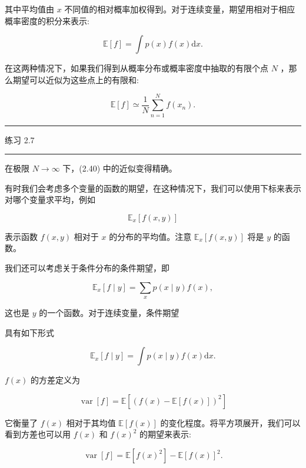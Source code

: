 \documentclass[10pt]{article}
\newcommand{\HRule}{\begin{center}\rule{0.9\linewidth}{0.2mm}\end{center}}
\begin{document}
其中平均值由 \(x\) 不同值的相对概率加权得到。对于连续变量，期望用相对于相应概率密度的积分来表示:

\[
\mathbb{E}\left\lbrack  f\right\rbrack   = \int p\left( x\right) f\left( x\right) \mathrm{d}x. \tag{2.39}
\]

在这两种情况下，如果我们得到从概率分布或概率密度中抽取的有限个点 \(N\) ，那么期望可以近似为这些点上的有限和:

\[
\mathbb{E}\left\lbrack  f\right\rbrack   \simeq  \frac{1}{N}\mathop{\sum }\limits_{{n = 1}}^{N}f\left( {x}_{n}\right) . \tag{2.40}
\]

\HRule

练习 2.7

\HRule

在极限 \(N \rightarrow  \infty\) 下，(2.40) 中的近似变得精确。

有时我们会考虑多个变量的函数的期望，在这种情况下，我们可以使用下标来表示对哪个变量求平均，例如

\[
{\mathbb{E}}_{x}\left\lbrack  {f\left( {x,y}\right) }\right\rbrack   \tag{2.41}
\]

表示函数 \(f\left( {x,y}\right)\) 相对于 \(x\) 的分布的平均值。注意 \({\mathbb{E}}_{x}\left\lbrack  {f\left( {x,y}\right) }\right\rbrack\) 将是 \(y\) 的函数。

我们还可以考虑关于条件分布的条件期望，即

\[
{\mathbb{E}}_{x}\left\lbrack  {f \mid  y}\right\rbrack   = \mathop{\sum }\limits_{x}p\left( {x \mid  y}\right) f\left( x\right) , \tag{2.42}
\]

这也是 \(y\) 的一个函数。对于连续变量，条件期望

具有如下形式

\[
{\mathbb{E}}_{x}\left\lbrack  {f \mid  y}\right\rbrack   = \int p\left( {x \mid  y}\right) f\left( x\right) \mathrm{d}x. \tag{2.43}
\]

\(f\left( x\right)\) 的方差定义为

\[
\operatorname{var}\left\lbrack  f\right\rbrack   = \mathbb{E}\left\lbrack  {\left( f\left( x\right)  - \mathbb{E}\left\lbrack  f\left( x\right) \right\rbrack  \right) }^{2}\right\rbrack   \tag{2.44}
\]

它衡量了 \(f\left( x\right)\) 相对于其均值 \(\mathbb{E}\left\lbrack  {f\left( x\right) }\right\rbrack\) 的变化程度。将平方项展开，我们可以看到方差也可以用 \(f\left( x\right)\) 和 \(f{\left( x\right) }^{2}\) 的期望来表示:

\[
\operatorname{var}\left\lbrack  f\right\rbrack   = \mathbb{E}\left\lbrack  {f{\left( x\right) }^{2}}\right\rbrack   - \mathbb{E}{\left\lbrack  f\left( x\right) \right\rbrack  }^{2}. \tag{2.45}
\]
\end{document}
